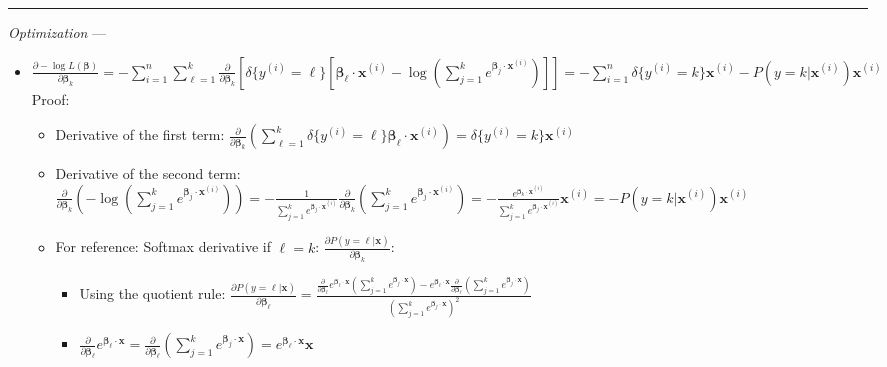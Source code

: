 {\color{lightgray}\hrule height 0.001mm}

\emph{Optimization} ---
\begin{itemize}
    \item
    $
    \frac{\partial -\log L(\boldsymbol{\beta})}{\partial \boldsymbol{\beta}_k} = -\sum_{i=1}^n \sum_{\ell=1}^k \frac{\partial}{\partial \boldsymbol{\beta}_k} [ \delta\{y^{(i)} = \ell\} [ \boldsymbol{\beta}_{\ell} \cdot \boldsymbol{x}^{(i)}- \log ( \sum_{j=1}^k e^{\boldsymbol{\beta}_j \cdot \boldsymbol{x}^{(i)}} ) ] ] = - \sum_{i=1}^n \delta\{y^{(i)} = k\} \boldsymbol{x}^{(i)} - P(y = k | \boldsymbol{x}^{(i)}) \boldsymbol{x}^{(i)}
    $\\
    Proof:
    \begin{itemize}
        \item Derivative of the first term: $\frac{\partial}{\partial \boldsymbol{\beta}_k} ( \sum_{\ell=1}^k \delta\{y^{(i)} = \ell\} \boldsymbol{\beta}_\ell \cdot \boldsymbol{x}^{(i)} ) = \delta\{y^{(i)} = k\} \boldsymbol{x}^{(i)}$
        \item Derivative of the second term: $\frac{\partial}{\partial \boldsymbol{\beta}_k} ( -\log ( \sum_{j=1}^k e^{\boldsymbol{\beta}_j \cdot \boldsymbol{x}^{(i)}} ) ) = -\frac{1}{\sum_{j=1}^k e^{\boldsymbol{\beta}_j \cdot \boldsymbol{x}^{(i)}}} \frac{\partial}{\partial \boldsymbol{\beta}_k} ( \sum_{j=1}^k e^{\boldsymbol{\beta}_j \cdot \boldsymbol{x}^{(i)}} ) = -\frac{e^{\boldsymbol{\beta}_k \cdot \boldsymbol{x}^{(i)}}}{\sum_{j=1}^k e^{\boldsymbol{\beta}_j \cdot \boldsymbol{x}^{(i)}}} \boldsymbol{x}^{(i)} = -P(y = k | \boldsymbol{x}^{(i)}) \boldsymbol{x}^{(i)}$
        \item For reference: Softmax derivative if $\ell = k$: $\frac{\partial P(y = \ell | \boldsymbol{x})}{\partial \boldsymbol{\beta}_k}$:
        \begin{itemize}
            \item Using the quotient rule:
            $
            \frac{\partial P(y = \ell | \boldsymbol{x})}{\partial \boldsymbol{\beta}_\ell} = \frac{\frac{\partial}{\partial \boldsymbol{\beta}_\ell} e^{\boldsymbol{\beta}_\ell \cdot \boldsymbol{x}} ( \sum_{j=1}^k e^{\boldsymbol{\beta}_j \cdot \boldsymbol{x}} ) - e^{\boldsymbol{\beta}_\ell \cdot \boldsymbol{x}} \frac{\partial}{\partial \boldsymbol{\beta}_\ell} ( \sum_{j=1}^k e^{\boldsymbol{\beta}_j \cdot \boldsymbol{x}} )}{( \sum_{j=1}^k e^{\boldsymbol{\beta}_j \cdot \boldsymbol{x}} )^2}
            $
            \item 
            $
            \frac{\partial}{\partial \boldsymbol{\beta}_\ell} e^{\boldsymbol{\beta}_\ell \cdot \boldsymbol{x}} = \frac{\partial}{\partial \boldsymbol{\beta}_\ell} ( \sum_{j=1}^k e^{\boldsymbol{\beta}_j \cdot \boldsymbol{x}} ) = e^{\boldsymbol{\beta}_\ell \cdot \boldsymbol{x}} \boldsymbol{x}$

\end{itemize}
\end{itemize}
\end{itemize}
